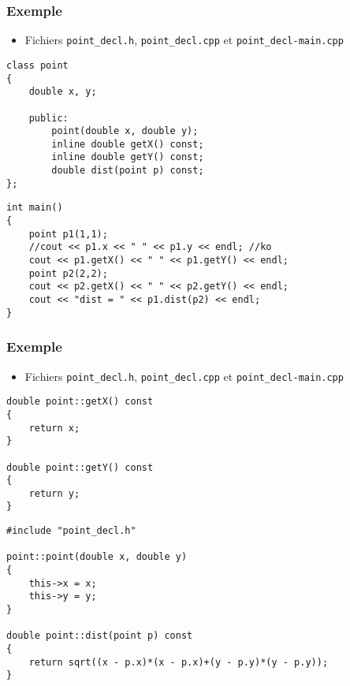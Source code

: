 \begin{frame}[containsverbatim]
\frametitle{Exemple \cpp}
\begin{itemize}
\item Fichiers \texttt{point\_decl.h}, \texttt{point\_decl.cpp} et \texttt{point\_decl-main.cpp}
\end{itemize}
\begin{lstlisting}
class point
{
	double x, y;

	public:
		point(double x, double y);
		inline double getX() const;
		inline double getY() const;
		double dist(point p) const;
};
\end{lstlisting}
\begin{lstlisting}
int main()
{
	point p1(1,1);
	//cout << p1.x << " " << p1.y << endl; //ko
	cout << p1.getX() << " " << p1.getY() << endl;	
	point p2(2,2);
	cout << p2.getX() << " " << p2.getY() << endl;
	cout << "dist = " << p1.dist(p2) << endl;
}
\end{lstlisting}
\end{frame}

\begin{frame}[containsverbatim]
\frametitle{Exemple}
\begin{itemize}
\item Fichiers \texttt{point\_decl.h}, \texttt{point\_decl.cpp} et \texttt{point\_decl-main.cpp}
\end{itemize}
\begin{lstlisting}
double point::getX() const
{
	return x;
}

double point::getY() const
{
	return y;
}
\end{lstlisting}
\begin{lstlisting}
#include "point_decl.h"

point::point(double x, double y)
{
	this->x = x;
	this->y = y;
}

double point::dist(point p) const
{
	return sqrt((x - p.x)*(x - p.x)+(y - p.y)*(y - p.y));
} 		
\end{lstlisting}
\end{frame}

